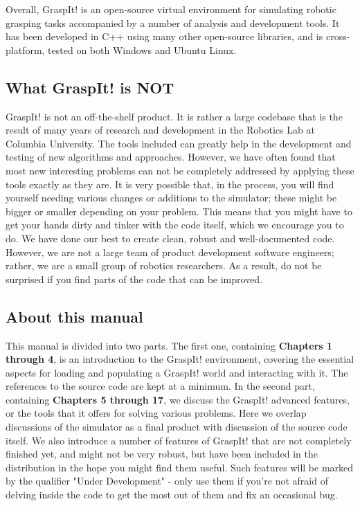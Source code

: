 Overall, GraspIt! is an open-source virtual environment for simulating
robotic grasping tasks accompanied by a number of analysis and
development tools. It has been developed in C++ using many other
open-source libraries, and is cross-platform, tested on both Windows
and Ubuntu Linux.

\subsection{What GraspIt! is NOT}

GraspIt! is not an off-the-shelf product. It is rather a large
codebase that is the result of many years of research and development
in the Robotics Lab at Columbia University. The tools included can
greatly help in the development and testing of new algorithms and
approaches. However, we have often found that most new interesting
problems can not be completely addressed by applying these tools
exactly as they are. It is very possible that, in the process, you
will find yourself needing various changes or additions to the
simulator; these might be bigger or smaller depending on your
problem. This means that you might have to get your hands dirty and
tinker with the code itself, which we encourage you to do. We have
done our best to create clean, robust and well-documented
code. However, we are not a large team of product development software
engineers; rather, we are a small group of robotics researchers. As a
result, do not be surprised if you find parts of the code that can be
improved.

\subsection{About this manual}

This manual is divided into two parts. The first one, containing
\textbf{Chapters 1 through 4}, is an introduction to the GraspIt!
environment, covering the essential aspects for loading and populating
a GraspIt!  world and interacting with it. The references to the
source code are kept at a minimum. In the second part, containing
\textbf{Chapters 5 through 17}, we discuss the GraspIt! advanced
features, or the tools that it offers for solving various
problems. Here we overlap discussions of the simulator as a final
product with discussion of the source code itself. We also introduce a
number of features of GraspIt!  that are not completely finished yet,
and might not be very robust, but have been included in the
distribution in the hope you might find them useful. Such features
will be marked by the qualifier "Under Development" - only use them if
you're not afraid of delving inside the code to get the most out of
them and fix an occasional bug.

